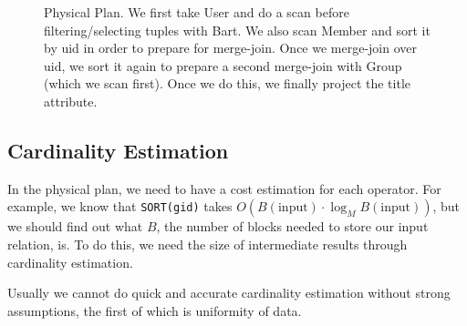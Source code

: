 \documentclass{article}
\begin{document}
\begin{example}
      \begin{figure}[H]
        \centering 
        \caption{Physical Plan. We first take User and do a scan before filtering/selecting tuples with Bart. We also scan Member and sort it by uid in order to prepare for merge-join. Once we merge-join over uid, we sort it again to prepare a second merge-join with Group (which we scan first). Once we do this, we finally project the title attribute. } 
        \label{fig:physical_plan}
      \end{figure}
    \end{example} 

  \subsection{Cardinality Estimation}

    In the physical plan, we need to have a cost estimation for each operator. For example, we know that \texttt{SORT(gid)} takes $O(B(\text{input}) \cdot \log_M B(\text{input}))$, but we should find out what $B$, the number of blocks needed to store our input relation, is. To do this, we need the size of intermediate results through cardinality estimation.  

    Usually we cannot do quick and accurate cardinality estimation without strong assumptions, the first of which is uniformity of data. 
\end{document}
